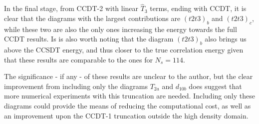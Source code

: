 In the final stage, from CCDT-2 with linear $\hat{T}_3$ terms, ending
with CCDT, it is clear that the diagrams with the largest
contributions are $(t2t3)_b$ and $(t2t3)_c$, while these two are also
the only ones increasing the energy towards the full CCDT results. Is is also
worth noting that the diagram $(t2t3)_b$ also brings us above the CCSDT
energy, and thus closer to the true correlation energy given that
these results are comparable to the ones for $N_s = 114$.

The significance - if any - of these results are unclear to the
author, but the clear improvement from including only the diagrams
$T_{2a}$ and $d_{10b}$ does suggest that more numerical experiments with this
truncation are needed. Including only these diagrams could provide the means of
reducing the computational cost, as well as an improvement upon the CCDT-1
truncation outside the high density domain.











\FloatBarrier

